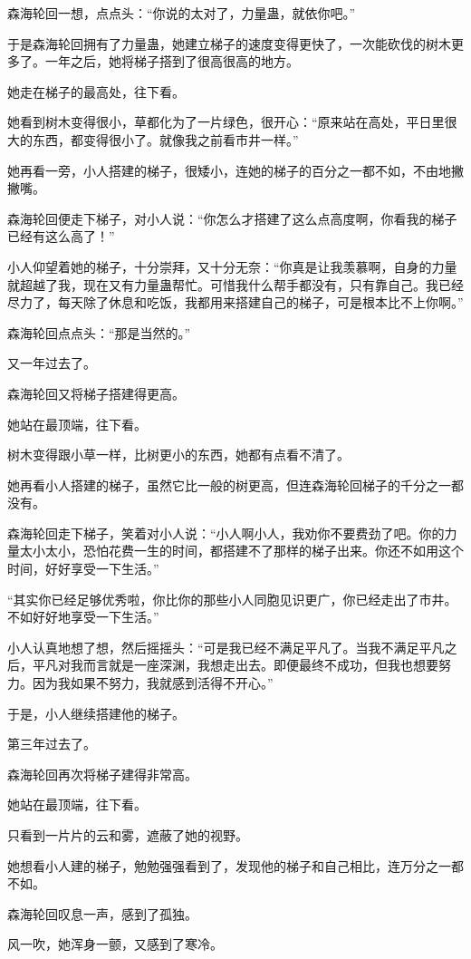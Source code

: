 \begin{this_body}
森海轮回一想，点点头：“你说的太对了，力量蛊，就依你吧。”

于是森海轮回拥有了力量蛊，她建立梯子的速度变得更快了，一次能砍伐的树木更多了。一年之后，她将梯子搭到了很高很高的地方。

她走在梯子的最高处，往下看。

她看到树木变得很小，草都化为了一片绿色，很开心：“原来站在高处，平日里很大的东西，都变得很小了。就像我之前看市井一样。”

她再看一旁，小人搭建的梯子，很矮小，连她的梯子的百分之一都不如，不由地撇撇嘴。

森海轮回便走下梯子，对小人说：“你怎么才搭建了这么点高度啊，你看我的梯子已经有这么高了！”

小人仰望着她的梯子，十分崇拜，又十分无奈：“你真是让我羡慕啊，自身的力量就超越了我，现在又有力量蛊帮忙。可惜我什么帮手都没有，只有靠自己。我已经尽力了，每天除了休息和吃饭，我都用来搭建自己的梯子，可是根本比不上你啊。”

森海轮回点点头：“那是当然的。”

又一年过去了。

森海轮回又将梯子搭建得更高。

她站在最顶端，往下看。

树木变得跟小草一样，比树更小的东西，她都有点看不清了。

她再看小人搭建的梯子，虽然它比一般的树更高，但连森海轮回梯子的千分之一都没有。

森海轮回走下梯子，笑着对小人说：“小人啊小人，我劝你不要费劲了吧。你的力量太小太小，恐怕花费一生的时间，都搭建不了那样的梯子出来。你还不如用这个时间，好好享受一下生活。”

“其实你已经足够优秀啦，你比你的那些小人同胞见识更广，你已经走出了市井。不如好好地享受一下生活。”

小人认真地想了想，然后摇摇头：“可是我已经不满足平凡了。当我不满足平凡之后，平凡对我而言就是一座深渊，我想走出去。即便最终不成功，但我也想要努力。因为我如果不努力，我就感到活得不开心。”

于是，小人继续搭建他的梯子。

第三年过去了。

森海轮回再次将梯子建得非常高。

她站在最顶端，往下看。

只看到一片片的云和雾，遮蔽了她的视野。

她想看小人建的梯子，勉勉强强看到了，发现他的梯子和自己相比，连万分之一都不如。

森海轮回叹息一声，感到了孤独。

风一吹，她浑身一颤，又感到了寒冷。


\end{this_body}

